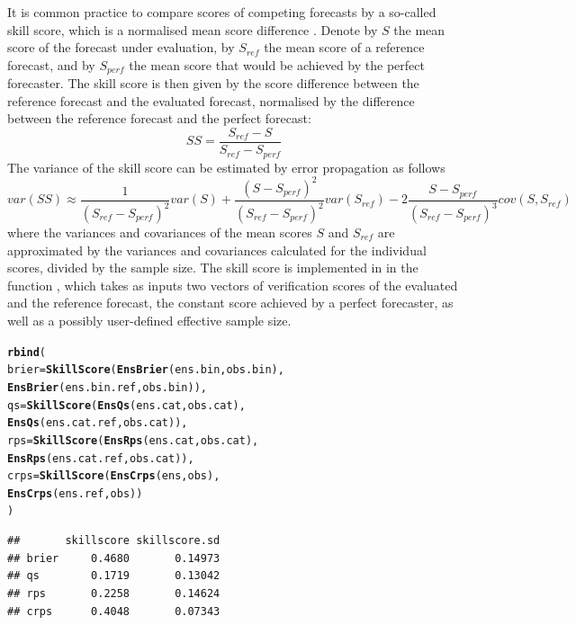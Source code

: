 \documentclass[article]{jss}\usepackage{graphicx, color}
\makeatletter
\newcommand{\hlfunctioncall}[1]{\textcolor[rgb]{0,0.501960784313725,0.752941176470588}{\textbf{#1}}}%
\newenvironment{kframe}{%
 \def\at@end@of@kframe{}%
 \ifinner\ifhmode%
  \def\at@end@of@kframe{\end{minipage}}%
  \begin{minipage}{\columnwidth}%
 \fi\fi%
 \def\FrameCommand##1{\hskip\@totalleftmargin \hskip-\fboxsep
 \colorbox{shadecolor}{##1}\hskip-\fboxsep
     \hskip-\linewidth \hskip-\@totalleftmargin \hskip\columnwidth}%
 \MakeFramed {\advance\hsize-\width
   \@totalleftmargin\z@ \linewidth\hsize
   \@setminipage}}%
 {\par\unskip\endMakeFramed%
 \at@end@of@kframe}
\newenvironment{knitrout}{}{} %
\makeatother
\begin{document}
It is common practice to compare scores of competing forecasts by a so-called skill score, which is a normalised mean score difference \citep{wilks2011statistical}.
Denote by $S$ the mean score of the forecast under evaluation, by $S_{ref}$ the mean score of a reference forecast, and by $S_{perf}$ the mean score that would be achieved by the perfect forecaster.
The skill score is then given by the score difference between the reference forecast and the evaluated forecast, normalised by the difference between the reference forecast and the perfect forecast:
%
\begin{equation}
SS = \frac{S_{ref} - S}{S_{ref} - S_{perf}}
\end{equation}
%
The variance of the skill score can be estimated by error propagation as follows
%
\begin{equation}
var(SS) \approx \frac{1}{(S_{ref} - S_{perf})^2} var(S) + \frac{(S - S_{perf})^2}{(S_{ref}-S_{perf})^2} var(S_{ref}) - 2 \frac{S-S_{perf}}{(S_{ref}-S_{perf})^3} cov(S, S_{ref})
\end{equation}
%
where the variances and covariances of the mean scores $S$ and $S_{ref}$ are approximated by the variances and covariances calculated for the individual scores, divided by the sample size.
The skill score is implemented in  in the function , which takes as inputs two vectors of verification scores of the evaluated and the reference forecast, the constant score achieved by a perfect forecaster, as well as a possibly user-defined effective sample size.


\begin{knitrout}
\color{fgcolor}\begin{kframe}
\begin{alltt}
\hlfunctioncall{rbind}(
  brier = \hlfunctioncall{SkillScore}(\hlfunctioncall{EnsBrier}(ens.bin, obs.bin), 
                     \hlfunctioncall{EnsBrier}(ens.bin.ref, obs.bin)),
  qs    = \hlfunctioncall{SkillScore}(\hlfunctioncall{EnsQs}(ens.cat, obs.cat),    
                     \hlfunctioncall{EnsQs}(ens.cat.ref, obs.cat)),
  rps   = \hlfunctioncall{SkillScore}(\hlfunctioncall{EnsRps}(ens.cat, obs.cat),   
                     \hlfunctioncall{EnsRps}(ens.cat.ref, obs.cat)),
  crps  = \hlfunctioncall{SkillScore}(\hlfunctioncall{EnsCrps}(ens, obs),          
                     \hlfunctioncall{EnsCrps}(ens.ref, obs))
)
\end{alltt}
\begin{verbatim}
##       skillscore skillscore.sd
## brier     0.4680       0.14973
## qs        0.1719       0.13042
## rps       0.2258       0.14624
## crps      0.4048       0.07343
\end{verbatim}
\end{kframe}
\end{knitrout}
\end{document}
